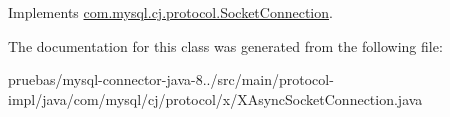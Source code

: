 Implements \mbox{\hyperlink{interfacecom_1_1mysql_1_1cj_1_1protocol_1_1_socket_connection_ac20aea608e999684c82a0dbaaa5886c7}{com.\+mysql.\+cj.\+protocol.\+Socket\+Connection}}.



The documentation for this class was generated from the following file\+:\begin{DoxyCompactItemize}
\item 
pruebas/mysql-\/connector-\/java-\/8../src/main/protocol-\/impl/java/com/mysql/cj/protocol/x/X\+Async\+Socket\+Connection.\+java\end{DoxyCompactItemize}
